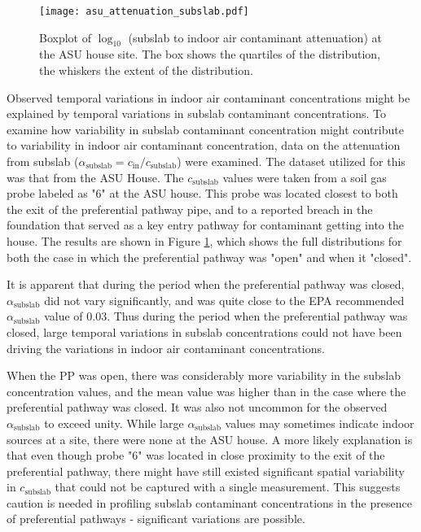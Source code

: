 \documentclass[journal=esthag,manuscript=article]{achemso}
\begin{document}
\begin{figure}[htb!]
 \caption{Boxplot of $\log_{10}$ (subslab to indoor air contaminant attenuation) at the ASU house site. The box shows the quartiles of the distribution, the whiskers the extent of the distribution.}\label{fig:attenuation_subslab}
 \texttt{[image: asu\_attenuation\_subslab.pdf]}
\end{figure}

Observed temporal variations in indoor air contaminant concentrations might be explained by temporal variations in subslab contaminant concentrations.
To examine how variability in subslab contaminant concentration might contribute to variability in indoor air contaminant concentration, data on the attenuation from subslab ($\alpha_\mathrm{subslab} = c_\mathrm{in}/c_\mathrm{subslab}$) were examined.
The dataset utilized for this was that from the ASU House.
The $c_\mathrm{subslab}$ values were taken from a soil gas probe labeled as "6" at the ASU house.
This probe was located closest to both the exit of the preferential pathway pipe, and to a reported breach in the foundation that served as a key entry pathway for contaminant getting into the house\cite{guo_identification_2015}.
The results are shown in Figure \ref{fig:attenuation_subslab}, which shows the full distributions for both the case in which the preferential pathway was "open" and when it "closed".\par

It is apparent that during the period when the preferential pathway was closed, $\alpha_\mathrm{subslab}$ did not vary significantly, and was quite close to the EPA recommended $\alpha_\mathrm{subslab}$ value of 0.03\cite{u.s._environmental_protection_agency_oswer_2015}.
Thus during the period when the preferential pathway was closed, large temporal variations in subslab concentrations could not have been driving the variations in indoor air contaminant concentrations.\par

When the PP was open, there was considerably more variability in the subslab concentration values, and the mean value was higher than in the case where the preferential pathway was closed.
It was also not uncommon for the observed $\alpha_\mathrm{subslab}$ to exceed unity.
While large $\alpha_\mathrm{subslab}$ values may sometimes indicate indoor sources at a site, there were none at the ASU house.
A more likely explanation is that even though probe "6" was located in close proximity to the exit of the preferential pathway, there might have still existed significant spatial variability in $c_\mathrm{subslab}$ that could not be captured with a single measurement.
This suggests caution is needed in profiling subslab contaminant concentrations in the presence of preferential pathways - significant variations are possible.\par
\end{document}
